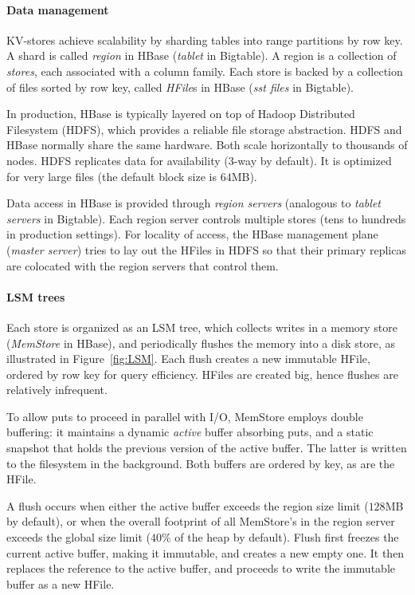 \paragraph{Data management}
KV-stores achieve scalability by sharding tables into range partitions by row key. 
A shard is called {\em region\/} in HBase (\emph{tablet} in Bigtable). 
A region is a collection of \emph{stores}, each associated with a column family. 
Each store is backed by a collection of files sorted by row key, called \emph{HFile}s in HBase 
(\emph{sst files} in Bigtable). 

In production, HBase is typically layered on top of Hadoop Distributed Filesystem (HDFS), 
which provides a reliable file storage abstraction. HDFS and HBase normally share the same hardware. 
Both scale horizontally to thousands of nodes. HDFS replicates data for availability (3-way by default). 
It is optimized for very large files (the default block size is $64$MB).

Data access in HBase is provided through {\em region servers} (analogous to {\em tablet servers}
in Bigtable). Each region server controls multiple stores (tens to hundreds in production settings). 
For locality of access, the HBase management plane (\emph{master server}) tries to lay out the 
HFiles in HDFS so that their primary replicas are colocated with the region servers that control them. 

\paragraph{LSM trees}
Each store is organized as an LSM tree, which collects writes in a memory store 
(\emph{MemStore} in HBase), and periodically flushes the memory into a disk store, as illustrated in 
Figure~\ref{fig:LSM}. Each flush creates a new immutable HFile, ordered by row key for query efficiency. 
HFiles are created big, hence flushes are relatively infrequent. 

To allow puts to proceed in parallel with I/O, MemStore employs double buffering:
it maintains a dynamic \emph{active} buffer absorbing puts, and a static snapshot
that holds the previous version of the active buffer. The latter is written to the 
filesystem in the background. Both buffers are ordered by key, as are the HFile.  

A flush occurs  when either the active buffer 
exceeds the region size limit ($128$MB by default), or when the overall footprint of all MemStore's
in the region server exceeds the global size limit ($40\%$ of the heap by default). 
Flush first freezes the current active buffer, making it immutable, and creates a new empty one.
It then replaces the reference to the active buffer, and proceeds to write the immutable buffer 
as a new HFile. 

